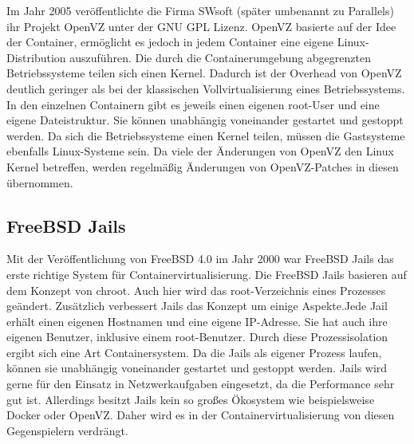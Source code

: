 Im Jahr 2005 veröffentlichte die Firma SWsoft (später umbenannt zu Parallels) ihr Projekt OpenVZ unter der GNU GPL Lizenz. OpenVZ basierte auf der Idee der Container, ermöglicht es jedoch in jedem Container eine eigene Linux-Distribution auszuführen.
Die durch die Containerumgebung abgegrenzten Betriebssysteme teilen sich einen Kernel. Dadurch ist der Overhead von OpenVZ deutlich geringer als bei der klassischen Vollvirtualisierung eines Betriebssystems.
In den einzelnen Containern gibt es jeweils einen eigenen root-User und eine eigene Dateistruktur.
Sie können unabhängig voneinander gestartet und gestoppt werden.
Da sich die Betriebssysteme einen Kernel teilen, müssen die Gastsysteme ebenfalls Linux-Systeme sein.
Da viele der Änderungen von OpenVZ den Linux Kernel betreffen, werden regelmäßig Änderungen von OpenVZ-Patches in diesen übernommen.\cite{OpenVzNews, IEEE4803091,OpenVzHist}


\subsection*{FreeBSD Jails}
\label{sec:jails}
Mit der Veröffentlichung von FreeBSD 4.0 im Jahr 2000 war FreeBSD Jails das erste richtige System für Containervirtualisierung.
Die FreeBSD Jails basieren auf dem Konzept von chroot. Auch hier wird das root-Verzeichnis eines Prozesses geändert. Zusätzlich verbessert Jails das Konzept um einige Aspekte.Jede Jail erhält einen eigenen Hostnamen	und eine eigene IP-Adresse. Sie hat auch ihre eigenen Benutzer, inklusive einem root-Benutzer. \cite{FreeBSDHB14} Durch diese Prozessisolation ergibt sich eine Art Containersystem. Da die Jails als eigener Prozess laufen, können sie unabhängig voneinander gestartet und gestoppt werden.  Jails wird gerne für den Einsatz in Netzwerkaufgaben eingesetzt, da die Performance sehr gut ist. Allerdings besitzt Jails kein so großes Ökosystem wie beispielsweise Docker oder OpenVZ. Daher wird es in der Containervirtualisierung von diesen Gegenspielern verdrängt.


